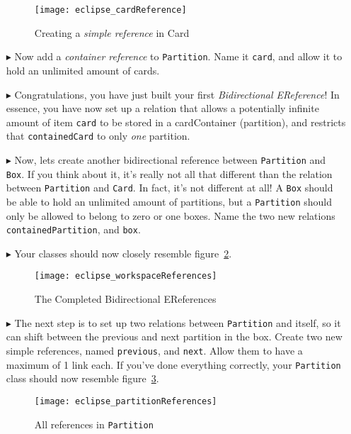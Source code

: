 \begin{itemize}
\begin{figure}[htbp]
	\centering
  \texttt{[image: eclipse\_cardReference]}
	\caption{Creating a \emph{simple reference} in Card}
	\label{fig:cardReference}
\end{figure} 

\item[$\blacktriangleright$] Now add a \emph{container reference} to \texttt{Partition}. Name it \texttt{card}, and allow it to hold an unlimited amount of
cards.

\item[$\blacktriangleright$] Congratulations, you have just built your first \emph{Bidirectional EReference}! In essence, you have now set up a relation that
allows a potentially infinite amount of item \texttt{card} to be stored in a cardContainer (partition), and restricts that \texttt{containedCard} to only
\emph{one} partition.

\item[$\blacktriangleright$] Now, lets create another bidirectional reference between \texttt{Partition} and \texttt{Box}. If you think about it, it's really
not all that different than the relation between \texttt{Partition} and \texttt{Card}. In fact, it's not different at all! A \texttt{Box} should be able to hold
an unlimited amount of partitions, but a \texttt{Partition} should only be allowed to belong to zero or one boxes. Name the two new relations
\texttt{containedPartition}, and \texttt{box}.

\item[$\blacktriangleright$] Your classes should now closely resemble figure~\ref{fig:allReferences}.


\begin{figure}[htbp]
	\centering
  \texttt{[image: eclipse\_workspaceReferences]}
	\caption{The Completed Bidirectional EReferences}
	\label{fig:allReferences}
\end{figure} 


\item[$\blacktriangleright$] The next step is to set up two relations between \texttt{Partition} and itself, so it can shift between the previous and next
partition in the box. Create two new simple references, named \texttt{previous}, and \texttt{next}. Allow them to have a maximum of 1 link each. If you've done
everything correctly, your \texttt{Partition} class should now resemble figure~\ref{fig:partitionReferences}.

\begin{figure}[htbp]
	\centering
  \texttt{[image: eclipse\_partitionReferences]}
	\caption{All references in \texttt{Partition}}
	\label{fig:partitionReferences}
\end{figure} 


\end{itemize}
